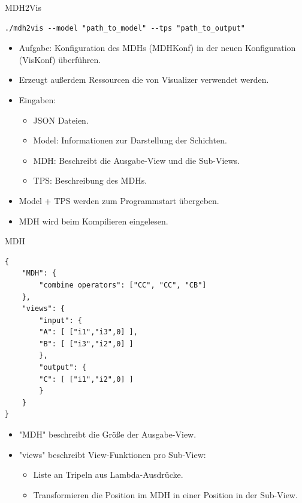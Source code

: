 \documentclass{presentation}
\begin{document}
\begin{frame}[fragile]{MDH2Vis}
    \begin{lstlisting}[style=context]
./mdh2vis --model "path_to_model" --tps "path_to_output"
    \end{lstlisting}

    \begin{itemize}
        \item Aufgabe: Konfiguration des MDHs (MDHKonf) 
                in der neuen Konfiguration (VisKonf) überführen.
        \item Erzeugt außerdem Ressourcen die von Visualizer verwendet werden.
        \item Eingaben:
        \begin{itemize}
            \item JSON Dateien.
            \item Model: Informationen zur Darstellung der Schichten.
            \item MDH: Beschreibt die Ausgabe-View und die Sub-Views.
            \item TPS: Beschreibung des MDHs.
        \end{itemize}
        \item Model + TPS werden zum Programmstart übergeben.
        \item MDH wird beim Kompilieren eingelesen.
    \end{itemize}
\end{frame}

\begin{frame}[fragile]{MDH}
    \begin{lstlisting}[style=context]
{
    "MDH": {
        "combine operators": ["CC", "CC", "CB"]
    },
    "views": {
        "input": {
        "A": [ ["i1","i3",0] ],
        "B": [ ["i3","i2",0] ]
        },
        "output": {
        "C": [ ["i1","i2",0] ]
        }
    }
}
    \end{lstlisting}

    \begin{itemize}
        \item "MDH" beschreibt die Größe der Ausgabe-View.
        \item "views" beschreibt View-Funktionen pro Sub-View:
        \begin{itemize}
            \item Liste an Tripeln aus Lambda-Ausdrücke.
            \item Transformieren die Position im MDH in einer Position in der Sub-View.
        \end{itemize}
    \end{itemize}
\end{frame}
\end{document}
